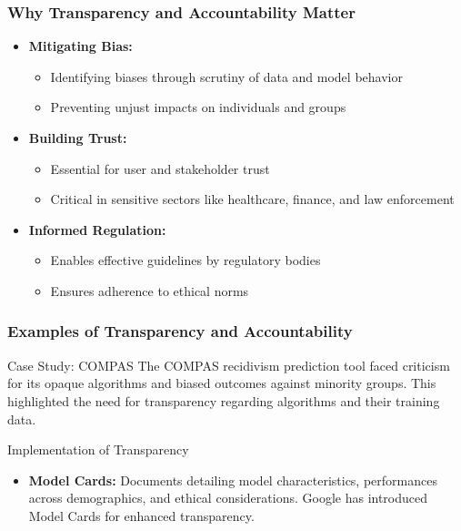 \documentclass{beamer}
\begin{document}
\begin{frame}[fragile]
    \frametitle{Why Transparency and Accountability Matter}
    \begin{itemize}
        \item \textbf{Mitigating Bias:}
            \begin{itemize}
                \item Identifying biases through scrutiny of data and model behavior
                \item Preventing unjust impacts on individuals and groups
            \end{itemize}
        \item \textbf{Building Trust:}
            \begin{itemize}
                \item Essential for user and stakeholder trust
                \item Critical in sensitive sectors like healthcare, finance, and law enforcement
            \end{itemize}
        \item \textbf{Informed Regulation:}
            \begin{itemize}
                \item Enables effective guidelines by regulatory bodies
                \item Ensures adherence to ethical norms
            \end{itemize}
    \end{itemize}
\end{frame}

\begin{frame}[fragile]
    \frametitle{Examples of Transparency and Accountability}
    \begin{block}{Case Study: COMPAS}
        The COMPAS recidivism prediction tool faced criticism for its opaque algorithms and biased outcomes against minority groups. This highlighted the need for transparency regarding algorithms and their training data.
    \end{block}
    \begin{block}{Implementation of Transparency}
        \begin{itemize}
            \item \textbf{Model Cards:} Documents detailing model characteristics, performances across demographics, and ethical considerations. Google has introduced Model Cards for enhanced transparency.
        \end{itemize}
    \end{block}
\end{frame}
\end{document}
